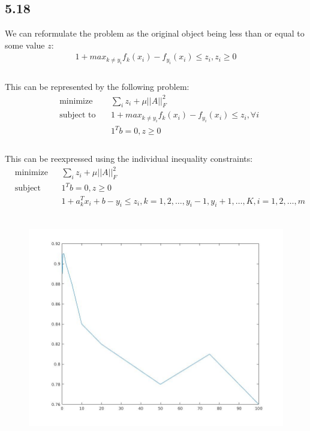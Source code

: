 \documentclass[12pt]{article}
\begin{document}
\subsection*{5.18}
We can reformulate the problem as the original object being less than or equal to some value $z$:
\begin{equation*}
\begin{aligned}
1+max_{k\neq y_i} f_k(x_i)  - f_{y_i} (x_i) \leq z_i,  z_i\geq 0\\
\end{aligned}
\end{equation*}\\
This can be represented by the following problem:
\begin{equation*}
\begin{aligned}
& \underset{}{\text{minimize}}
& &  \sum_i z_i + \mu ||A||_F^2\\
& \text{subject to}\
& & 1+max_{k\neq y_i} f_k(x_i) - f_{y_i} (x_i) \leq z_i, \forall i\\
&&&  1^T b= 0,   z \geq 0\\
\end{aligned}
\end{equation*}\\
This can be reexpressed using the individual inequality constraints:
\begin{equation*}
\begin{aligned}
& \underset{}{\text{minimize}}
& &  \sum_i z_i + \mu ||A||_F^2\\
& \text{subject to}\
& &  1^T b= 0,   z \geq 0\\
&&&  1+a_k^Tx_i + b  - y_i \leq z_i,    k = 1, 2, …,  y_i -1, y_i +1, …, K, i=1, 2, …, m
\end{aligned}
\end{equation*}\\
\begin{figure}[h]
\includegraphics[scale=.25]{Problem_5_18.jpg}
\end{figure}
\end{document}
